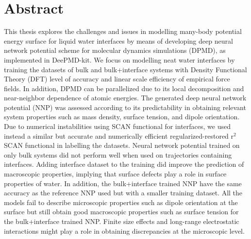 \chapter*{Abstract}

This thesis explores the challenges and issues in modelling  many-body potential energy surface
for liquid water interfaces by means of developing deep neural network potential  scheme for molecular dynamics simulations (DPMD), as implemented in DeePMD-kit. We focus on modelling  neat water interfaces by training the datasets of bulk and bulk+interface systems with Density Functional Theory (DFT) level of accuracy and linear scale efficiency of empirical force fields. In addition, DPMD can be parallelized due to its local decomposition and  near-neighbor dependence of  atomic energies. The generated deep neural network potential (NNP) was assessed according to its predictability in obtaining relevant system properties such as mass density, surface tension, and dipole orientation. Due to numerical instabilities using SCAN functional for interfaces, we used instead a similar  but accurate and numerically efficient regularized-restored r$^2$SCAN functional in labelling the datasets. Neural network potential trained on only bulk
systems did not perform well when used on trajectories containing interfaces. Adding interface dataset to the training
did improve the prediction  of macroscopic properties, implying that surface defects
play a role in surface properties of water. In addition, the bulk+interface trained NNP have the same accuracy as the reference NNP used but with a smaller  training dataset. All the models  fail to describe microscopic properties such as dipole orientation at the surface but still obtain good macroscopic properties such as surface tension for the bulk+interface trained NNP.  Finite size effects  and  long-range electrostatic interactions might play a role in obtaining  discrepancies at the microscopic level.
